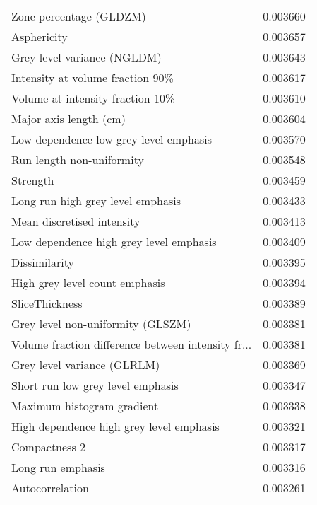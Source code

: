 \begin{longtable}{|lr|}
Zone percentage (GLDZM)                            &        0.003660 \\
Asphericity                                        &        0.003657 \\
Grey level variance (NGLDM)                        &        0.003643 \\
Intensity at volume fraction 90\%                   &        0.003617 \\
Volume at intensity fraction 10\%                   &        0.003610 \\
Major axis length (cm)                             &        0.003604 \\
Low dependence low grey level emphasis             &        0.003570 \\
Run length non-uniformity                          &        0.003548 \\
Strength                                           &        0.003459 \\
Long run high grey level emphasis                  &        0.003433 \\
Mean discretised intensity                         &        0.003413 \\
Low dependence high grey level emphasis            &        0.003409 \\
Dissimilarity                                      &        0.003395 \\
High grey level count emphasis                     &        0.003394 \\
SliceThickness                                     &        0.003389 \\
Grey level non-uniformity (GLSZM)                  &        0.003381 \\
Volume fraction difference between intensity fr... &        0.003381 \\
Grey level variance (GLRLM)                        &        0.003369 \\
Short run low grey level emphasis                  &        0.003347 \\
Maximum histogram gradient                         &        0.003338 \\
High dependence high grey level emphasis           &        0.003321 \\
Compactness 2                                      &        0.003317 \\
Long run emphasis                                  &        0.003316 \\
Autocorrelation                                    &        0.003261 \\

\end{longtable}

